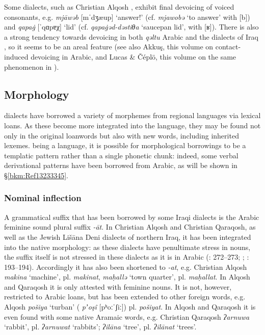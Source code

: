 \documentclass[output=paper]{langsci/langscibook}
\begin{document}
Some  dialects, such as Christian Alqosh \citep[27]{Coghill2004}, exhibit final {devoicing} of voiced consonants, e.g. \textit{mjāwəb} [mˈdʒæup] ‘answer!’ (cf. \textit{mjawobə} ‘to answer’ with [b]) and \textit{qapa\.g} [ˈqɑpɐχ] ‘lid’ (cf. \textit{qapa\.gəd-dəstiθa} ‘saucepan lid’, with [ʁ]). There is also a strong tendency towards {devoicing} in both \textit{qəltu} Arabic \citep[98]{Jastrow1978} and the  dialects of Iraq \citep[49]{MacKenzie1961}, so it seems to be an areal feature (see also Akkuş, this volume on contact-induced {devoicing} in  Arabic, and Lucas \& Čéplö, this volume on the same phenomenon in ).

\subsection{Morphology}

 dialects have borrowed a variety of morphemes from regional languages via lexical loans. As these become more integrated into the language, they may be found not only in the original {loanwords} but also with new words, including inherited lexemes.  being a  language, it is possible for morphological borrowings to be a templatic pattern rather than a single phonetic chunk: indeed, some verbal {derivational} patterns have been borrowed from Arabic, as will be shown in §\ref{bkm:Ref13233345}.

\subsubsection{\label{bkm:Ref534226861}Nominal inflection}

A grammatical suffix that has been borrowed by some Iraqi dialects is the Arabic feminine sound plural suffix \textit{{}-āt}. In Christian Alqosh and Christian Qaraqosh, as well as the Jewish Lišāna Deni dialects of northern Iraq, it has been integrated into the native morphology: as these dialects have penultimate {stress} in nouns, the suffix itself is not stressed in these dialects as it is in Arabic (\citealt{Coghill2004}: 272–273; \citeyear{Coghill2005}; \citealt{Khan2002}: 193–194). Accordingly it has also been shortened to \textit{\nobreakdash-at}, e.g. Christian Alqosh \textit{makina} ‘machine’, pl. \textit{makinat}, \textit{maḥallə} ‘town quarter’, pl. \textit{maḥallat}. In Alqosh and Qaraqosh it is only attested with feminine nouns. It is not, however, restricted to Arabic loans, but has been extended to other foreign words, e.g. Alqosh \textit{pošiya} ‘turban’ ( \textit{pʼoşî} [pʰoːˈʃiː]) pl. \textit{pošiyat}. In Alqosh and Qaraqosh it is even found with some native Aramaic words, e.g. Christian Qaraqosh \textit{ʔarnuwa} ‘rabbit’, pl. \textit{ʔarnuwat} ‘rabbits’; \textit{ʔilāna} ‘tree’, pl. \textit{ʔilānat} ‘trees’.
\end{document}
